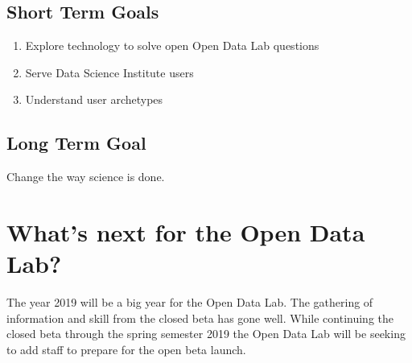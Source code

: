 \subsection*{Short Term Goals}
\begin{enumerate}
\item Explore technology to solve open Open Data Lab questions
\item Serve Data Science Institute users
\item Understand user archetypes
\end{enumerate}
\subsection*{Long Term Goal}
Change the way science is done.

\section{What's next for the Open Data Lab?}
The year 2019 will be a big year for the Open Data Lab. The gathering of information and skill from the closed beta has gone well. While continuing the closed beta through the spring semester 2019 the Open Data Lab will be seeking to add staff to prepare for the open beta launch.